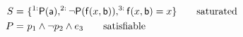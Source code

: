 \begin{align*}
			S=&\ \{
			^{1:}{\mathsf P}({\mathsf a}),
			^{2:}\lnot{\mathsf P}({\mathsf f}(x,{\mathsf b})), 
			^{3:}{\mathsf f}(x,{\mathsf b}) = x
			\} \tag*{saturated}\\
			P=&\ p_1 \land \lnot p_2 \land e_3 \tag*{satisfiable}
				\end{align*}